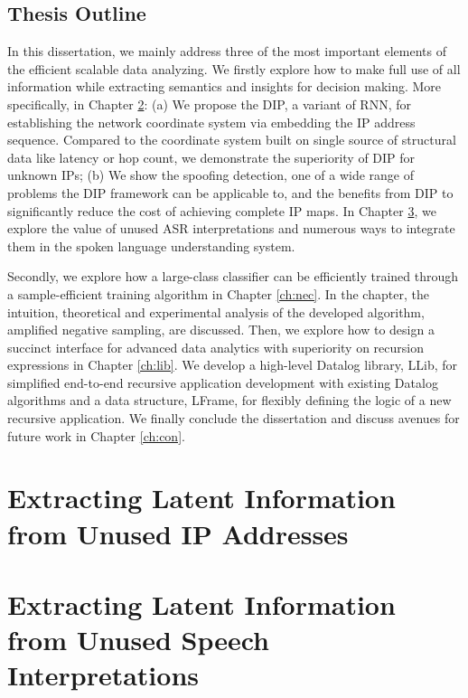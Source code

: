\documentclass [PhD] {uclathes}
\begin{document}
\section{Thesis Outline}

In this dissertation, we mainly address  three of the most important elements of the efficient scalable data analyzing. We firstly explore how to make full use of all information while extracting semantics and insights for decision making. More specifically, in  Chapter \ref{ch:dip}: (a) We propose the DIP, a variant of RNN, for establishing the network coordinate system via embedding the IP address sequence. Compared to the coordinate system built on single source of structural data like latency or hop count, we demonstrate the superiority of DIP for unknown IPs; (b) We show the spoofing detection, one of a wide range of problems the DIP framework can be applicable to, and the benefits from DIP to   significantly reduce  the cost of achieving complete IP maps. In Chapter \ref{ch:nbest}, we explore the value of unused ASR interpretations and numerous ways to integrate them in the  spoken language understanding system.   

Secondly, we explore how a 
  large-class classifier can be  efficiently trained through a sample-efficient training algorithm in Chapter \ref{ch:nec}. In the chapter, the intuition, theoretical and experimental analysis of the  developed algorithm, amplified negative sampling, are  discussed.  Then, we explore how to design a succinct interface for advanced data analytics with superiority on recursion expressions in Chapter \ref{ch:lib}. We develop a high-level Datalog library, LLib,  for simplified end-to-end recursive application development with existing Datalog algorithms and a data structure, LFrame, for flexibly defining  the logic of a new recursive application. We finally conclude the dissertation and discuss avenues for future work in Chapter \ref{ch:con}.
  
  




\chapter{Extracting Latent  Information from Unused IP Addresses}
\label{ch:dip}



\chapter{Extracting Latent Information from Unused Speech Interpretations}
\label{ch:nbest}
\end{document}
